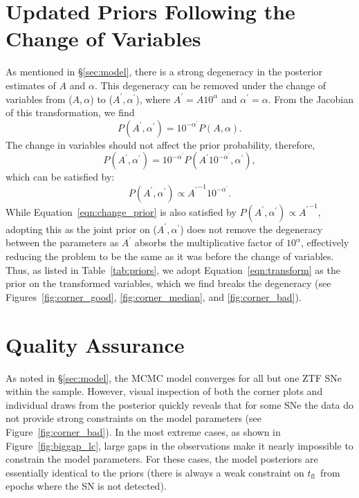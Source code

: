 \documentclass[twocolumn]{./aastex63}
\newcommand{\tfl}{$t_\mathrm{fl}$}
\begin{document}
\section{Updated Priors Following the Change of Variables}\label{sec:prior}

As mentioned in \S\ref{sec:model}, there is a strong degeneracy in the
posterior estimates of $A$ and $\alpha$. This degeneracy can be removed under
the change of variables from ($A, \alpha$) to ($A^\prime, \alpha^\prime$),
where $A^\prime = A 10^\alpha$ and $\alpha^\prime = \alpha$. From the Jacobian
of this transformation, we find
$$P(A^\prime, \alpha^\prime) = 10^{-\alpha^\prime} P(A,\alpha).$$
The change in variables should not affect the prior probability, therefore,
\begin{equation} 
    P(A^\prime, \alpha^\prime) = 10^{-\alpha^\prime} P(A^\prime
10^{-\alpha^\prime},\alpha^\prime), 
\label{eqn:change_prior} 
\end{equation}
which can be satisfied by:
\begin{equation}
    P(A^\prime, \alpha^\prime) \propto {A^\prime}^{-1} 10^{-\alpha^\prime}.
\label{eqn:transform}
\end{equation}
While Equation~\ref{eqn:change_prior} is also satisfied by $P(A^\prime,
\alpha^\prime) \propto {A^\prime}^{-1}$, adopting this as the joint prior on
($A^\prime, \alpha^\prime$) does not remove the degeneracy between the
parameters as $A^\prime$ absorbs the multiplicative factor of $10^\alpha$,
effectively reducing the problem to be the same as it was before the change of
variables. Thus, as listed in Table~\ref{tab:priors}, we adopt
Equation~\ref{eqn:transform} as the prior on the transformed variables, which
we find breaks the degeneracy (see Figures~\ref{fig:corner_good},
\ref{fig:corner_median}, and \ref{fig:corner_bad}).

\section{Quality Assurance}\label{sec:qa}

As noted in \S\ref{sec:model}, the MCMC model converges for all but one ZTF
SNe within the sample. However, visual inspection of both the corner plots and
individual draws from the posterior quickly reveals that for some SNe the data
do not provide strong constraints on the model parameters (see Figure~\ref{fig:corner_bad}). In the most extreme cases, as shown in
Figure~\ref{fig:biggap_lc}, large gaps in the observations make it nearly
impossible to constrain the model parameters. For these cases, the model
posteriors are essentially identical to the priors (there is always a weak
constraint on \tfl\ from epochs where the SN is not detected).
\end{document}
